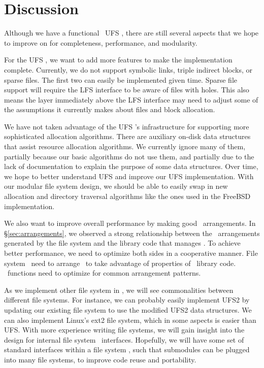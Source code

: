 \section {Discussion}
\label{sec:discussion}

Although we have a functional \Kudos\ UFS \module, there are still several
aspects that we hope to improve on for completeness, performance, and
modularity.

For the UFS \module, we want to add more features to make the implementation
complete. Currently, we do not support symbolic links, triple indirect blocks,
or sparse files. The first two can easily be implemented given time. Sparse
file support will require the LFS interface to be aware of files with holes.
This also means the layer immediately above the LFS interface may need to
adjust some of the assumptions it currently makes about files and block
allocation.

We have not taken advantage of the UFS \module's infrastructure for supporting
more sophisticated allocation algorithms. There are auxiliary on-disk data
structures that assist resource allocation algorithms. We currently ignore many
of them, partially because our basic algorithms do not use them, and partially
due to the lack of documentation to explain the purpose of some data
structures. Over time, we hope to better understand UFS and improve our UFS
implementation. With our modular file system design, we should be able to
easily swap in new allocation and directory traversal algorithms like the ones
used in the FreeBSD implementation.

We also want to improve overall performance by making good
\chdesc\ arrangements. In \S\ref{sec:arrangements}, we observed a
strong relationship between the \chdesc\ arrangements generated by the file
system and the library code that manages \chdescs. To achieve better
performance, we need to optimize both sides in a cooperative manner. File
system \modules\ need to arrange \chdescs\ to take advantage of properties of
\chdesc\ library code. \Chdesc\ functions need to optimize for common
arrangement patterns.

As we implement other file system in \Kudos, we will see commonalities between
different file systems. For instance, we can probably easily implement UFS2 by
updating our existing file system to use the modified UFS2 data structures.
We can also implement Linux's ext2 file system, which in some aspects is
easier than UFS. With more experience writing file systems, we will
gain insight into the design for internal file system \module\ interfaces.
Hopefully, we will have some set of standard interfaces within a file system
\module, such that submodules can be plugged into many file systems, to improve
code reuse and portability.

